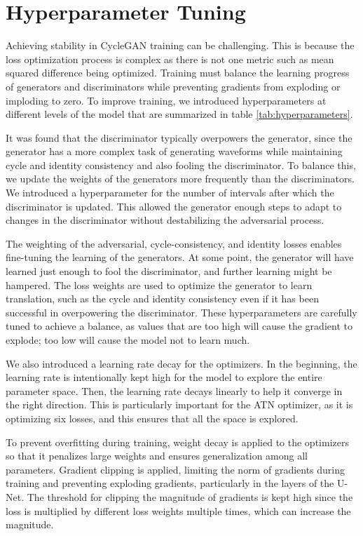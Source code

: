 \section{Hyperparameter Tuning}
Achieving stability in CycleGAN training can be challenging. This is because the loss optimization process is complex as there is not one metric such as mean squared difference being optimized. Training must balance the learning progress of generators and discriminators while preventing gradients from exploding or imploding to zero. To improve training, we introduced hyperparameters at different levels of the model that are summarized in table \ref{tab:hyperparameters}.



It was found that the discriminator typically overpowers the generator, since the generator has a more complex task of generating waveforms while maintaining cycle and identity consistency and also fooling the discriminator. To balance this, we update the weights of the generators more frequently than the discriminators. We introduced a hyperparameter for the number of intervals after which the discriminator is updated. This allowed the generator enough steps to adapt to changes in the discriminator without destabilizing the adversarial process.

The weighting of the adversarial, cycle-consistency, and identity losses enables fine-tuning the learning of the generators. At some point, the generator will have learned just enough to fool the discriminator, and further learning might be hampered. The loss weights are used to optimize the generator to learn translation, such as the cycle and identity consistency even if it has been successful in overpowering the discriminator. These hyperparameters are carefully tuned to achieve a balance, as values that are too high will cause the gradient to explode; too low will cause the model not to learn much. 

We also introduced a learning rate decay for the optimizers. In the beginning, the learning rate is intentionally kept high for the model to explore the entire parameter space. Then, the learning rate decays linearly to help it converge in the right direction. This is particularly important for the ATN optimizer, as it is optimizing six losses, and this ensures that all the space is explored.

To prevent overfitting during training, weight decay is applied to the optimizers so that it penalizes large weights and ensures generalization among all parameters. Gradient clipping is applied, limiting the norm of gradients during training and preventing exploding gradients, particularly in the layers of the U-Net. The threshold for clipping the magnitude of gradients is kept high since the loss is multiplied by different loss weights multiple times, which can increase the magnitude.

